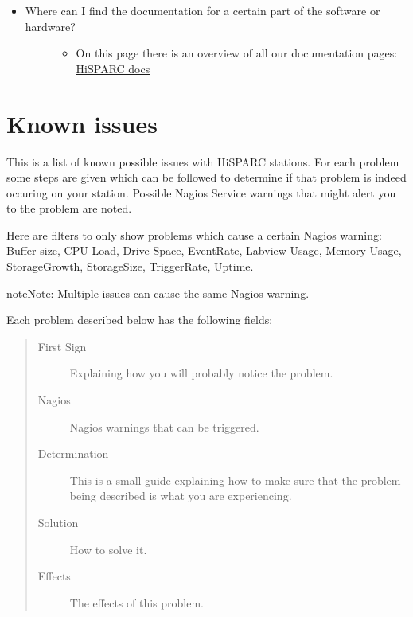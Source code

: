 \documentclass[a4paper,11pt,english]{sphinxmanual}
\begin{document}
\begin{itemize}
\begin{description}
\begin{itemize}
\end{itemize}

\end{description}

\item {} \begin{description}
\item[{Where can I find the documentation for a certain part of the software or hardware?}] \leavevmode\begin{itemize}
\item {} 
On this page there is an overview of all our documentation pages: \href{http://docs.hisparc.nl/}{HiSPARC docs}

\end{itemize}

\end{description}

\end{itemize}


\chapter{Known issues}
\label{known-issues:known-issues}\label{known-issues::doc}
This is a list of known possible issues with HiSPARC stations. For each problem some steps are given which can be followed to determine if that problem is indeed occuring on your station. Possible Nagios Service warnings that might alert you to the problem are noted.

Here are filters to only show problems which cause a certain Nagios warning:
Buffer size,
CPU Load,
Drive Space,
EventRate,
Labview Usage,
Memory Usage,
StorageGrowth,
StorageSize,
TriggerRate,
Uptime.

\begin{notice}{note}{Note:}
Multiple issues can cause the same Nagios warning.
\end{notice}

Each problem described below has the following fields:
\begin{quote}\begin{description}
\item[{First Sign}] \leavevmode
Explaining how you will probably notice the problem.

\item[{Nagios}] \leavevmode
Nagios warnings that can be triggered.

\item[{Determination}] \leavevmode
This is a small guide explaining how to make sure that the problem being described is what you are experiencing.

\item[{Solution}] \leavevmode
How to solve it.

\item[{Effects}] \leavevmode
The effects of this problem.

\end{description}\end{quote}
\end{document}

